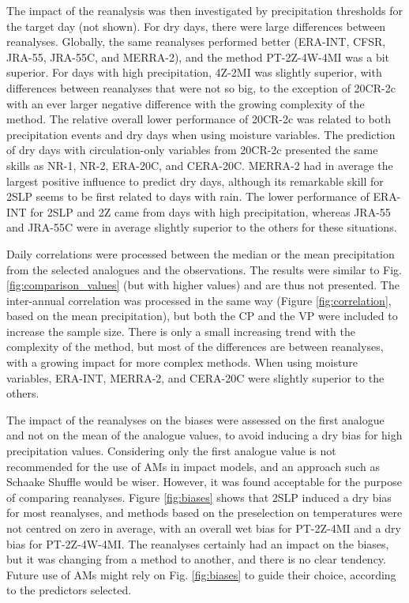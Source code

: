 \documentclass{ametsoc}
\begin{document}
The impact of the reanalysis was then investigated by precipitation thresholds for the target day (not shown). For dry days, there were large differences between reanalyses. Globally, the same reanalyses performed better (ERA-INT, CFSR, JRA-55, JRA-55C, and MERRA-2), and the method PT-2Z-4W-4MI was a bit superior. For days with high precipitation, 4Z-2MI was slightly superior, with differences between reanalyses that were not so big, to the exception of 20CR-2c with an ever larger negative difference with the growing complexity of the method. The relative overall lower performance of 20CR-2c was related to both precipitation events and dry days when using moisture variables. The prediction of dry days with circulation-only variables from 20CR-2c presented the same skills as NR-1, NR-2, ERA-20C, and CERA-20C. MERRA-2 had in average the largest positive influence to predict dry days, although its remarkable skill for 2SLP seems to be first related to days with rain. The lower performance of ERA-INT for 2SLP and 2Z came from days with high precipitation, whereas JRA-55 and JRA-55C were in average slightly superior to the others for these situations.

Daily correlations were processed between the median or the mean precipitation from the selected analogues and the observations. The results were similar to Fig. \ref{fig:comparison_values} (but with higher values) and are thus not presented. The inter-annual correlation was processed in the same way (Figure \ref{fig:correlation}, based on the mean precipitation), but both the CP and the VP were included to increase the sample size. There is only a small increasing trend with the complexity of the method, but most of the differences are between reanalyses, with a growing impact for more complex methods. When using moisture variables, ERA-INT, MERRA-2, and CERA-20C were slightly superior to the others.

The impact of the reanalyses on the biases were assessed on the first analogue and not on the mean of the analogue values, to avoid inducing a dry bias for high precipitation values. Considering only the first analogue value is not recommended for the use of AMs in impact models, and an approach such as Schaake Shuffle \citep{Clark2004a} would be wiser. However, it was found acceptable for the purpose of comparing reanalyses. Figure \ref{fig:biases} shows that 2SLP induced a dry bias for most reanalyses, and methods based on the preselection on temperatures were not centred on zero in average, with an overall wet bias for PT-2Z-4MI and a dry bias for PT-2Z-4W-4MI. The reanalyses certainly had an impact on the biases, but it was changing from a method to another, and there is no clear tendency. Future use of AMs might rely on Fig. \ref{fig:biases} to guide their choice, according to the predictors selected.
\end{document}
